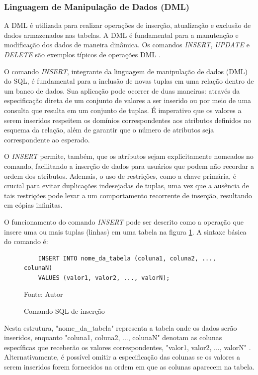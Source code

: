 \subsubsection{Linguagem de Manipulação de Dados (DML)}

A DML é utilizada para realizar operações de inserção, atualização e exclusão de dados armazenados nas tabelas. A DML é fundamental para a manutenção e modificação dos dados de maneira dinâmica. Os comandos \textit{INSERT}, \textit{UPDATE} e \textit{DELETE} são exemplos típicos de operações DML \cite{silberschatz2011database}.


O comando \textit{INSERT}, integrante da linguagem de manipulação de dados (DML) do SQL, é fundamental para a inclusão de novas tuplas em uma relação dentro de um banco de dados. Sua aplicação pode ocorrer de duas maneiras: através da especificação direta de um conjunto de valores a ser inserido ou por meio de uma consulta que resulta em um conjunto de tuplas. É imperativo que os valores a serem inseridos respeitem os domínios correspondentes aos atributos definidos no esquema da relação, além de garantir que o número de atributos seja correspondente ao esperado.\cite{silberschatz2011database} 

O \textit{INSERT} permite, também, que os atributos sejam explicitamente nomeados no comando, facilitando a inserção de dados para usuários que podem não recordar a ordem dos atributos. Ademais, o uso de restrições, como a chave primária, é crucial para evitar duplicações indesejadas de tuplas, uma vez que a ausência de tais restrições pode levar a um comportamento recorrente de inserção, resultando em cópias infinitas.\cite{silberschatz2011database}

O funcionamento do comando \textit{INSERT} pode ser descrito como a operação que insere uma ou mais tuplas (linhas) em uma tabela na figura \ref{lst:sql_insert}. A sintaxe básica do comando é:

\begin{figure}[H]
    \centering
    \begin{lstlisting}
    INSERT INTO nome_da_tabela (coluna1, coluna2, ..., colunaN) 
    VALUES (valor1, valor2, ..., valorN);
    \end{lstlisting}
    \caption{Comando SQL de inserção}
    Fonte: Autor
    \label{lst:sql_insert}
\end{figure}



Nesta estrutura, "nome\_da\_tabela" representa a tabela onde os dados serão inseridos, enquanto "coluna1, coluna2, ..., colunaN" denotam as colunas específicas que receberão os valores correspondentes, "valor1, valor2, ..., valorN" \cite{silberschatz2011database}. Alternativamente, é possível omitir a especificação das colunas se os valores a serem inseridos forem fornecidos na ordem em que as colunas aparecem na tabela.

